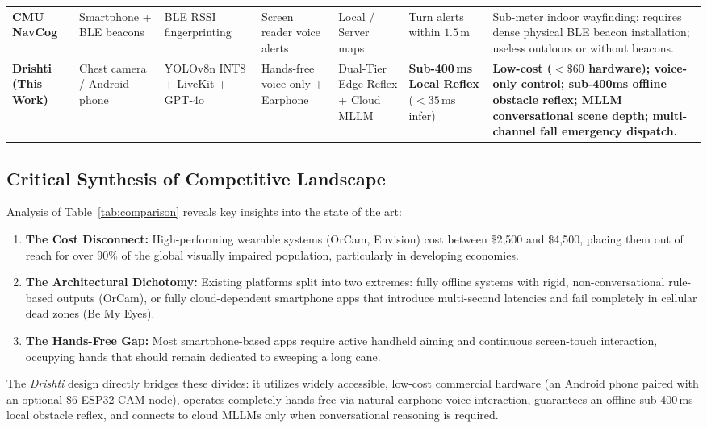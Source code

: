 \documentclass[10pt,twocolumn]{article}
\begin{document}
\begin{table}[t]
\begin{tabularx}{\textwidth}{l p{2.2cm} p{2.0cm} p{2.0cm} p{2.2cm} p{2.4cm} X}
\addlinespace
\textbf{CMU NavCog} \cite{sato2017navcog} & Smartphone + BLE beacons & BLE RSSI fingerprinting & Screen reader voice alerts & Local / Server maps & Turn alerts within $1.5\,\text{m}$ & Sub-meter indoor wayfinding; requires dense physical BLE beacon installation; useless outdoors or without beacons. \\
\addlinespace
\textbf{Drishti (This Work)} & Chest camera / Android phone & YOLOv8n INT8 + LiveKit + GPT-4o & Hands-free voice only + Earphone & Dual-Tier Edge Reflex + Cloud MLLM & \textbf{Sub-400\,ms Local Reflex} ($<35\,\text{ms}$ infer) & \textbf{Low-cost ($<\$60$ hardware); voice-only control; sub-400ms offline obstacle reflex; MLLM conversational scene depth; multi-channel fall emergency dispatch.} \\
\bottomrule
\end{tabularx}
\end{table}

\subsection{Critical Synthesis of Competitive Landscape}
Analysis of Table~\ref{tab:comparison} reveals key insights into the state of the art:
\begin{enumerate}[leftmargin=*]
    \item \textbf{The Cost Disconnect:} High-performing wearable systems (OrCam, Envision) cost between \$2,500 and \$4,500, placing them out of reach for over 90\% of the global visually impaired population, particularly in developing economies.
    \item \textbf{The Architectural Dichotomy:} Existing platforms split into two extremes: fully offline systems with rigid, non-conversational rule-based outputs (OrCam), or fully cloud-dependent smartphone apps that introduce multi-second latencies and fail completely in cellular dead zones (Be My Eyes).
    \item \textbf{The Hands-Free Gap:} Most smartphone-based apps require active handheld aiming and continuous screen-touch interaction, occupying hands that should remain dedicated to sweeping a long cane.
\end{enumerate}

The \textit{Drishti} design directly bridges these divides: it utilizes widely accessible, low-cost commercial hardware (an Android phone paired with an optional \$6 ESP32-CAM node), operates completely hands-free via natural earphone voice interaction, guarantees an offline sub-400\,ms local obstacle reflex, and connects to cloud MLLMs only when conversational reasoning is required.
\end{document}
